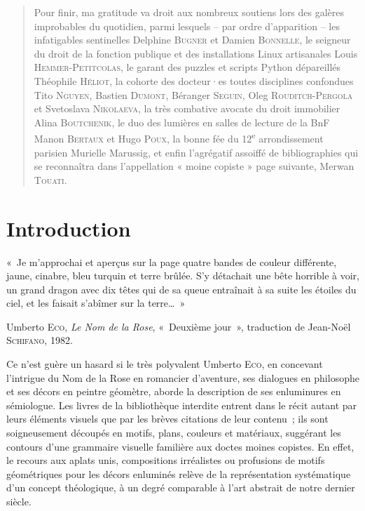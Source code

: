 \documentclass[a4paper,12pt, twoside]{book}
\begin{document}
\begin{quote}
\small{Pour finir, ma gratitude va droit aux nombreux soutiens lors des galères improbables du quotidien, parmi lesquels – par ordre d’apparition – les infatigables sentinelles Delphine \textsc{Bugner} et Damien \textsc{Bonnelle}, le seigneur du droit de la fonction publique et des installations Linux artisanales Louis \textsc{Hemmer-Petitcolas}, le garant des puzzles et scripts Python dépareillés Théophile \textsc{Héliot}, la cohorte des docteur·es toutes disciplines confondues Tito \textsc{Nguyen}, Bastien \textsc{Dumont}, Béranger \textsc{Seguin}, Oleg \textsc{Rouditch-Pergola} et Svetoslava \textsc{Nikolaeva}, la très combative avocate du droit immobilier Alina \textsc{Boutchenik}, le duo des lumières en salles de lecture de la BnF Manon \textsc{Bertaux} et Hugo \textsc{Poux}, la bonne fée du 12\textsuperscript{e} arrondissement parisien Murielle {Marussig}, et enfin l’agrégatif assoiffé de bibliographies qui se reconnaîtra dans l’appellation « moine copiste » page suivante, Merwan \textsc{Touati}.}
\end{quote}

\clearemptydoublepage
\chapter*{Introduction}

\begin{flushright}
\scriptsize\textcolor{teal3}{«~Je m’approchai et aperçus sur la page quatre bandes de couleur différente, jaune, cinabre, bleu turquin et terre brûlée. S’y détachait une bête horrible à voir, un grand dragon avec dix têtes qui de sa queue entraînait à sa suite les étoiles du ciel, et les faisait s’abîmer sur la terre…~»}\\

\medskip

\textcolor{teal3}{Umberto \textsc{Eco}, \textit{Le Nom de la Rose}, «~Deuxième jour~», traduction de Jean-Noël \textsc{Schifano}, 1982.}
\end{flushright}
\normalsize
\bigskip

Ce n’est guère un hasard si le très polyvalent Umberto \textsc{Eco}, en concevant l’intrigue du Nom de la Rose en romancier d’aventure, ses dialogues en philosophe et ses décors en peintre géomètre, aborde la description de ses enluminures en sémiologue. Les livres de la bibliothèque interdite entrent dans le récit autant par leurs éléments visuels que par les brèves citations de leur contenu~; ils sont soigneusement découpés en motifs, plans, couleurs et matériaux, suggérant les contours d’une grammaire visuelle familière aux doctes moines copistes. En effet, le recours aux aplats unis, compositions irréalistes ou profusions de motifs géométriques pour les décors enluminés relève de la représentation systématique d’un concept théologique, à un degré comparable à l’art abstrait de notre dernier siècle.
\end{document}
